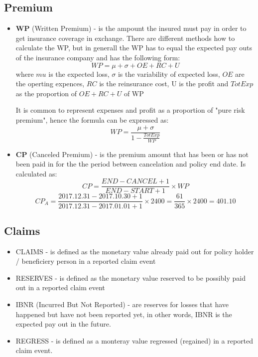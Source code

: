 \documentclass[11pt,a4paper,fleqn]{article}      %
\begin{document}
\subsection{Premium}


\begin{itemize}
\item \textbf{WP} (Written Premium) - is the ampount the insured must pay in order to get insurance coverage in exchange. There are different methods how to calculate the WP, but in generall the WP has to equal the expected pay outs of the insurance company and has the following form:
$$WP=\mu + \sigma +OE +RC+U$$ 
where $mu$ is the expected loss, $\sigma$ is the variability of expected loss, $OE$ are the operting expences, $RC$ is the reinsurance cost, U is the profit and $TotExp$ as the proportion of $OE+RC+U$ of WP

It is common to represent expenses and profit as a proportion of "pure risk premium", hence the formula can be expressed as:
$$WP=\frac{\mu + \sigma}{1-\frac{TotExp}{WP}}$$ 




\item \textbf{CP} (Canceled Premium) - is the premium amount that has been or has not been paid in for the the period between cancelation and policy end date. Is calculated as: 
$$CP=\frac{END-CANCEL+1}{END-START+1} \times WP $$
$$CP_A=\frac{2017.12.31-2017.10.30+1}{2017.12.31-2017.01.01+1} \times 2400=  \frac{61}{365} \times 2400=401.10 $$


\end{itemize}

\subsection{Claims}

\begin{itemize}
\item CLAIMS - is defined as the monetary value already paid out for policy holder / beneficiery person in a reported claim event
\item RESERVES - is defined as the monetary value reserved to be possibly paid out in a reported claim event
\item IBNR (Incurred But Not Reported) - are reserves for losses that have happened but have not been reported yet, in other words, IBNR is the expected pay out in the future.
\item REGRESS - is defined as a monteray value regressed (regained) in a reported claim event.
\end{itemize}
\end{document}
